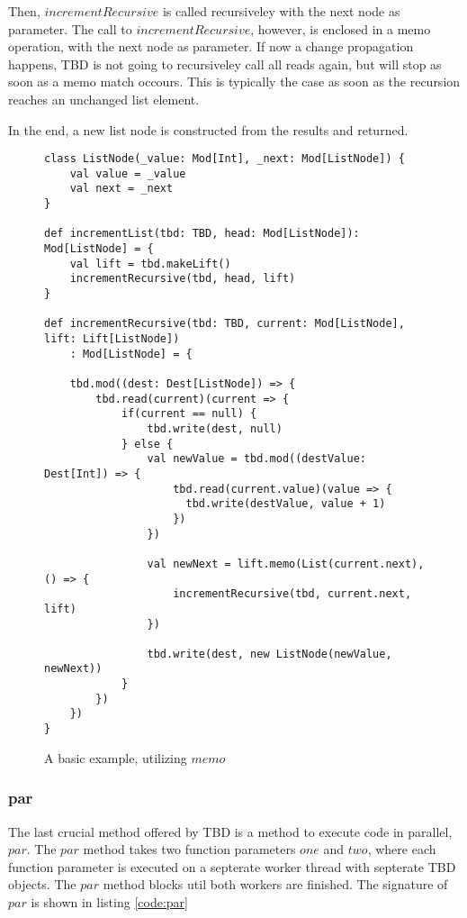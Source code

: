 Then, $incrementRecursive$ is called recursiveley with the next node as parameter. The call to $incrementRecursive$, however, is enclosed in a memo operation, with the next node as parameter. If now a change propagation happens, TBD is not going to recursiveley call all reads again, but will stop as soon as a memo match occours. This is typically the case as soon as the recursion reaches an unchanged list element. 

In the end, a new list node is constructed from the results and returned. 
\begin{figure*}
\begin{lstlisting}[frame=single,basicstyle=\ttfamily]
class ListNode(_value: Mod[Int], _next: Mod[ListNode]) {
    val value = _value
    val next = _next
}

def incrementList(tbd: TBD, head: Mod[ListNode]): Mod[ListNode] = {
    val lift = tbd.makeLift()
    incrementRecursive(tbd, head, lift)
}

def incrementRecursive(tbd: TBD, current: Mod[ListNode], lift: Lift[ListNode])
    : Mod[ListNode] = {

    tbd.mod((dest: Dest[ListNode]) => {
        tbd.read(current)(current => {
            if(current == null) {
                tbd.write(dest, null)
            } else {
                val newValue = tbd.mod((destValue: Dest[Int]) => {
                    tbd.read(current.value)(value => {
                      tbd.write(destValue, value + 1)
                    })
                })

                val newNext = lift.memo(List(current.next), () => {
                    incrementRecursive(tbd, current.next, lift)
                })

                tbd.write(dest, new ListNode(newValue, newNext))
            } 
        })
    })
}

\end{lstlisting}
\caption{A basic example, utilizing $memo$}
\label{code:memoExample}
\end{figure*}

\subsubsection{par}
The last crucial method offered by TBD is a method to execute code in parallel, $par$. The $par$ method takes two function parameters $one$ and $two$, where each function parameter is executed on a septerate worker thread with septerate TBD objects. The $par$ method blocks util both workers are finished. The signature of $par$ is shown in listing \ref{code:par}

